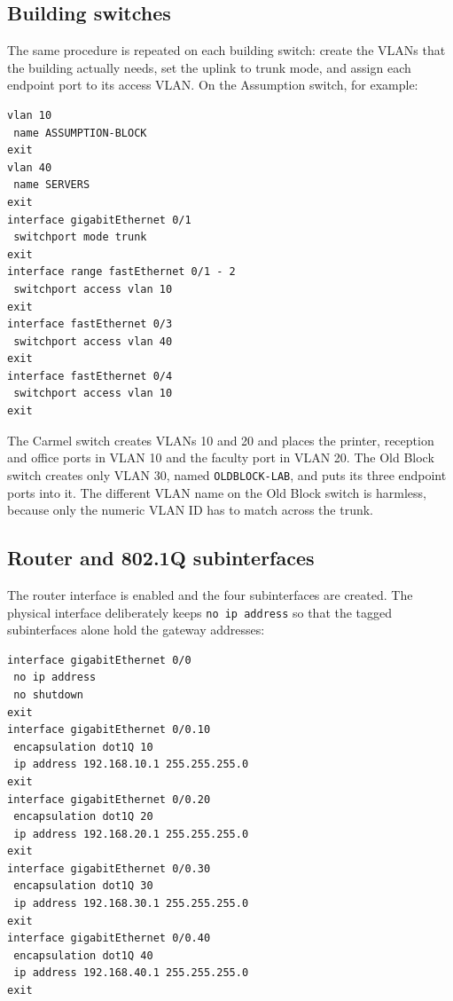 \documentclass[11pt,a4paper]{article}
\begin{document}
\subsection{Building switches}

\noindent
The same procedure is repeated on each building switch: create the VLANs that the
building actually needs, set the uplink to trunk mode, and assign each endpoint port
to its access VLAN. On the Assumption switch, for example:

\begin{lstlisting}[caption={Assumption switch \texttt{RCSS-SW-ASSUMPTION}}]
vlan 10
 name ASSUMPTION-BLOCK
exit
vlan 40
 name SERVERS
exit
interface gigabitEthernet 0/1
 switchport mode trunk
exit
interface range fastEthernet 0/1 - 2
 switchport access vlan 10
exit
interface fastEthernet 0/3
 switchport access vlan 40
exit
interface fastEthernet 0/4
 switchport access vlan 10
exit
\end{lstlisting}

\noindent
The Carmel switch creates VLANs 10 and 20 and places the printer, reception and office
ports in VLAN 10 and the faculty port in VLAN 20. The Old Block switch creates only
VLAN 30, named \texttt{OLDBLOCK-LAB}, and puts its three endpoint ports into it. The
different VLAN name on the Old Block switch is harmless, because only the numeric VLAN
ID has to match across the trunk.

\subsection{Router and 802.1Q subinterfaces}

\noindent
The router interface is enabled and the four subinterfaces are created. The physical
interface deliberately keeps \texttt{no ip address} so that the tagged subinterfaces
alone hold the gateway addresses:

\begin{lstlisting}[caption={Router \texttt{RCSS-R1} --- router-on-a-stick}]
interface gigabitEthernet 0/0
 no ip address
 no shutdown
exit
interface gigabitEthernet 0/0.10
 encapsulation dot1Q 10
 ip address 192.168.10.1 255.255.255.0
exit
interface gigabitEthernet 0/0.20
 encapsulation dot1Q 20
 ip address 192.168.20.1 255.255.255.0
exit
interface gigabitEthernet 0/0.30
 encapsulation dot1Q 30
 ip address 192.168.30.1 255.255.255.0
exit
interface gigabitEthernet 0/0.40
 encapsulation dot1Q 40
 ip address 192.168.40.1 255.255.255.0
exit
\end{lstlisting}
\end{document}
